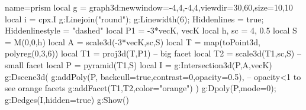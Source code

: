 \documentclass[12pt]{standalone}%
\begin{document}
\begin{luadraw}{name=prism}
local g = graph3d:new{window={-4,4,-4,4},viewdir={30,60},size={10,10}}
local i = cpx.I
g:Linejoin("round"); g:Linewidth(6); Hiddenlines = true; Hiddenlinestyle = "dashed"
local P1 = {-3*vecK, vecK}
local h, sc = 4, 0.5
local S = M(0,0,h)
local A = scale3d(-3*vecK,sc,S)
local T = map(toPoint3d, polyreg(0,3,6))
local T1 = proj3d(T,P1) -- big facet
local T2 = scale3d(T1,sc,S) -- small facet
local P = pyramid(T1,S)
local I = g:Intersection3d(P,{A,vecK})
g:Dscene3d(
    g:addPoly(P, {backcull=true,contrast=0,opacity=0.5}), -- opacity<1 to see orange facets
    g:addFacet({T1,T2},{color="orange"})
    )
g:Dpoly(P,{mode=0}); g:Dedges(I,{hidden=true})
g:Show()
\end{luadraw}
\end{document}
